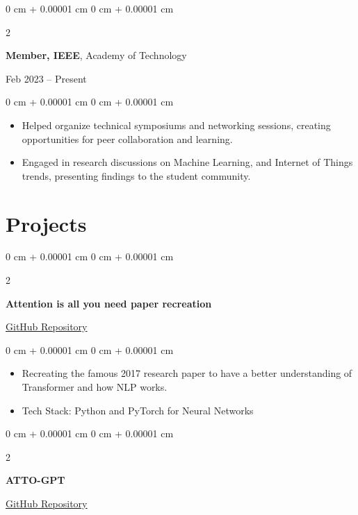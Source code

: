 \documentclass[10pt, letterpaper]{article}
\newenvironment{highlights}{
    \begin{itemize}[
        topsep=0.10 cm,
        parsep=0.10 cm,
        partopsep=0pt,
        itemsep=0pt,
        leftmargin=0 cm + 10pt
    ]
}{
    \end{itemize}
} %
\newenvironment{onecolentry}{
    \begin{adjustwidth}{
        0 cm + 0.00001 cm
    }{
        0 cm + 0.00001 cm
    }
}{
    \end{adjustwidth}
} %
\newenvironment{twocolentry}[2][]{
    \onecolentry
    \def\secondColumn{#2}
    \setcolumnwidth{\fill, 4.5 cm}
    \begin{paracol}{2}
}{
    \switchcolumn \raggedleft \secondColumn
    \end{paracol}
    \endonecolentry
} %
\begin{document}
\vspace{0.2 cm}

\begin{twocolentry}{
    Feb 2023 – Present
}
    \textbf{Member, IEEE}, Academy of Technology
\end{twocolentry}

\vspace{0.10 cm}

\begin{onecolentry}
    \begin{highlights}
        \item Helped organize technical symposiums and networking sessions, creating opportunities for peer collaboration and learning.
        \item Engaged in research discussions on Machine Learning, and Internet of Things trends, presenting findings to the student community.
    \end{highlights}
\end{onecolentry}

\section{Projects}

\begin{twocolentry}{
    \href{https://github.com/debarshee2004/attention-is-all-you-need}{GitHub Repository}
}
    \textbf{Attention is all you need paper recreation}
\end{twocolentry}

\vspace{0.10 cm}

\begin{onecolentry}
    \begin{highlights}
        \item Recreating the famous 2017 research paper to have a better understanding of Transformer and how NLP works.
        \item Tech Stack: Python and PyTorch for Neural Networks
    \end{highlights}
\end{onecolentry}

\vspace{0.2 cm}

\begin{twocolentry}{
    \href{https://github.com/debarshee2004/atto-gpt}{GitHub Repository}
}
    \textbf{ATTO-GPT}
\end{twocolentry}

\vspace{0.10 cm}
\end{document}
